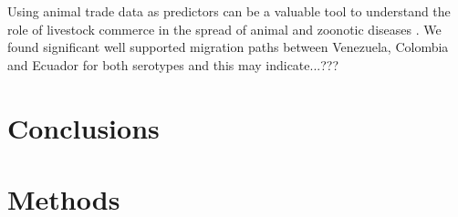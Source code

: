 \documentclass[10pt]{article}
\begin{document}
Using animal trade data as predictors can be a valuable tool to understand the role of livestock commerce in the spread of animal and zoonotic diseases \cite{Nelson2011}.
We found significant well supported migration paths between Venezuela, Colombia and Ecuador for both serotypes and this may indicate...???%



\section*{Conclusions}
\section*{Methods}
\end{document}
